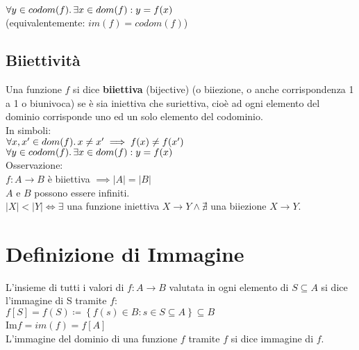 \documentclass[a4paper, twoside, italian, 11pt]{book}
\newcommand{\braces}[1] {\left \{ #1 \right \}}
\newcommand{\card}[1] {\left | #1 \right |}
\begin{document}
$\forall y \in codom(f) \ldotp \exists x \in dom(f) : y = f(x)$ \\

\noindent
(equivalentemente: $im(f) = codom(f)$)


\subsection{Biiettività}

Una funzione $f$ si dice \textbf{biiettiva} (bijective) (o biiezione, o anche corrispondenza 1 a 1 o biunivoca) se è sia iniettiva che suriettiva, cioè ad ogni elemento del dominio corrisponde uno ed un solo elemento del codominio. \\

\noindent
In simboli: \\

$\forall x, x' \in dom(f) \ldotp x \neq x' \implies f(x) \neq f(x')$ \\
\indent
$\forall y \in codom(f) \ldotp \exists x \in dom(f) : y = f(x)$ \\


\noindent
Osservazione: \\

$f : A \rightarrow B$ è biiettiva $\implies \card A = \card B$ \\

\noindent
$A$ e $B$ possono essere infiniti. \\

\noindent
$\card X < \card Y \iff \exists$ una funzione iniettiva $X \rightarrow Y \land \nexists$ una biiezione $X \rightarrow Y$.



\section{Definizione di Immagine}

L'insieme di tutti i valori di $f : A \rightarrow B$ valutata in ogni elemento di $S \subseteq A$ si dice l'immagine di S tramite $f$: \\

$f[S] = f(S) \coloneqq \braces{f(s) \in B : s \in S \subseteq A} \subseteq B$ \\

Im$f = im(f) = f[A]$ \\

\noindent
L'immagine del dominio di una funzione $f$ tramite $f$ si dice immagine di $f$.\\
\end{document}
